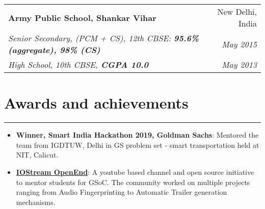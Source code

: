 \documentclass[a4paper,6pt]{article}
\begin{document}
\vspace{5px}
\hspace{5px}
\begin{tabularx}{\textwidth}{X r}
	\textbf{Army Public School, Shankar Vihar} & New Delhi, India \\
	\textit{\small Senior Secondary, (PCM + CS), 12th CBSE:  \textcolor{mygray}{\textbf{95.6\% (aggregate), 98\% (CS)}}} & \textit{May 2015} \\
	\textit{\small High School, 10th CBSE, \textcolor{mygray}{\textbf{CGPA 10.0}}} & \textit{May 2013}
\end{tabularx}


\section*{Awards and achievements}
\vspace{-8px}
\hrule
\vspace{8px}
\begin{itemize}
	\item \small \textbf{Winner, Smart India Hackathon 2019, Goldman Sachs}: Mentored the team from IGDTUW, Delhi in GS problem set - smart transportation held at NIT, Calicut.
	\item \small \textbf{\href{https://github.com/IOStream-OpenEnd}{IOStream OpenEnd}}: \small A youtube based channel and open source initiative to mentor students for GSoC. The community worked on multiple projects ranging from Audio Fingerprinting to Automatic Trailer generation mechanisms.
\end{itemize}
\end{document}
